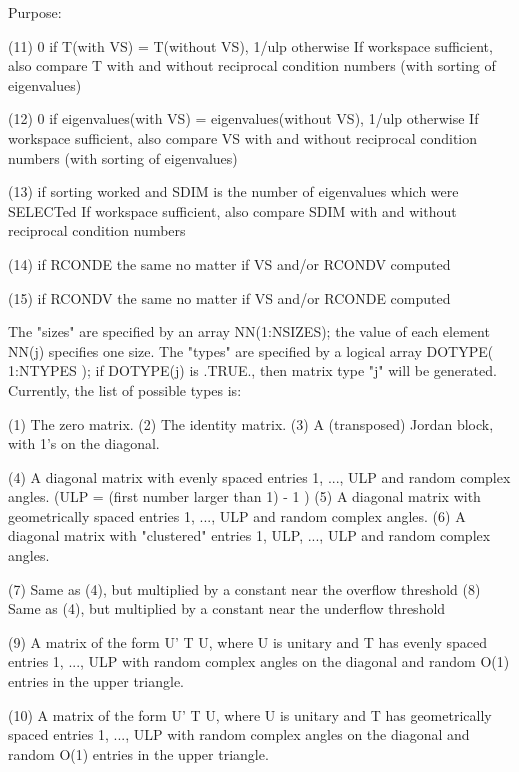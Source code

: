 \begin{DoxyParagraph}{Purpose\+: }
\begin{DoxyVerb}
    (11)    0     if T(with VS) = T(without VS),
            1/ulp otherwise
            If workspace sufficient, also compare T with and without
            reciprocal condition numbers
            (with sorting of eigenvalues)

    (12)    0     if eigenvalues(with VS) = eigenvalues(without VS),
            1/ulp otherwise
            If workspace sufficient, also compare VS with and without
            reciprocal condition numbers
            (with sorting of eigenvalues)

    (13)    if sorting worked and SDIM is the number of
            eigenvalues which were SELECTed
            If workspace sufficient, also compare SDIM with and
            without reciprocal condition numbers

    (14)    if RCONDE the same no matter if VS and/or RCONDV computed

    (15)    if RCONDV the same no matter if VS and/or RCONDE computed

    The "sizes" are specified by an array NN(1:NSIZES); the value of
    each element NN(j) specifies one size.
    The "types" are specified by a logical array DOTYPE( 1:NTYPES );
    if DOTYPE(j) is .TRUE., then matrix type "j" will be generated.
    Currently, the list of possible types is:

    (1)  The zero matrix.
    (2)  The identity matrix.
    (3)  A (transposed) Jordan block, with 1's on the diagonal.

    (4)  A diagonal matrix with evenly spaced entries
         1, ..., ULP  and random complex angles.
         (ULP = (first number larger than 1) - 1 )
    (5)  A diagonal matrix with geometrically spaced entries
         1, ..., ULP  and random complex angles.
    (6)  A diagonal matrix with "clustered" entries 1, ULP, ..., ULP
         and random complex angles.

    (7)  Same as (4), but multiplied by a constant near
         the overflow threshold
    (8)  Same as (4), but multiplied by a constant near
         the underflow threshold

    (9)  A matrix of the form  U' T U, where U is unitary and
         T has evenly spaced entries 1, ..., ULP with random
         complex angles on the diagonal and random O(1) entries in
         the upper triangle.

    (10) A matrix of the form  U' T U, where U is unitary and
         T has geometrically spaced entries 1, ..., ULP with random
         complex angles on the diagonal and random O(1) entries in
         the upper triangle.


\end{DoxyVerb}
\end{DoxyParagraph}
